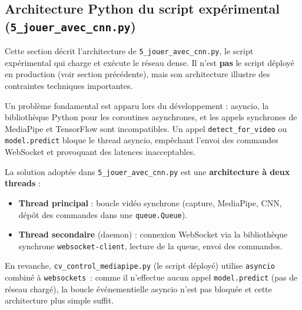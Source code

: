 \documentclass[12pt, a4paper]{article}
\newcommand{\code}[1]{\texttt{\small #1}}
\begin{document}
\subsection{Architecture Python du script expérimental (\texttt{5\_jouer\_avec\_cnn.py})}

Cette section décrit l'architecture de \code{5\_jouer\_avec\_cnn.py}, le script
expérimental qui charge et exécute le réseau dense. Il n'est \textbf{pas} le
script déployé en production (voir section précédente), mais son architecture
illustre des contraintes techniques importantes.

Un problème fondamental est apparu lors du développement : asyncio, la
bibliothèque Python pour les coroutines asynchrones, et les appels synchrones
de MediaPipe et TensorFlow sont incompatibles. Un appel \code{detect\_for\_video}
ou \code{model.predict} bloque le thread asyncio, empêchant l'envoi des commandes
WebSocket et provoquant des latences inacceptables.

La solution adoptée dans \code{5\_jouer\_avec\_cnn.py} est une \textbf{architecture
à deux threads} :

\begin{itemize}
  \item \textbf{Thread principal} : boucle vidéo synchrone (capture, MediaPipe,
        CNN, dépôt des commandes dans une \code{queue.Queue}).
  \item \textbf{Thread secondaire} (daemon) : connexion WebSocket via la bibliothèque
        synchrone \code{websocket-client}, lecture de la queue, envoi des commandes.
\end{itemize}

En revanche, \code{cv\_control\_mediapipe.py} (le script déployé) utilise
\code{asyncio} combiné à \code{websockets}~: comme il n'effectue aucun appel
\code{model.predict} (pas de réseau chargé), la boucle événementielle asyncio
n'est pas bloquée et cette architecture plus simple suffit.
\end{document}
